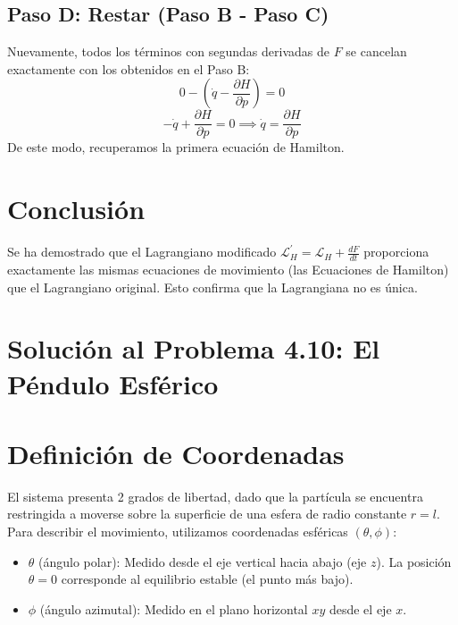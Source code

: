\documentclass[12pt, a4paper]{article}
\begin{document}
\subsection*{Paso D: Restar (Paso B - Paso C)}
Nuevamente, todos los términos con segundas derivadas de $F$ se cancelan exactamente con los obtenidos en el Paso B:
\begin{equation}
    0 - \left( \dot{q} - \frac{\partial H}{\partial p} \right) = 0
\end{equation}
\begin{equation}
    -\dot{q} + \frac{\partial H}{\partial p} = 0 \implies \dot{q} = \frac{\partial H}{\partial p}
\end{equation}
De este modo, recuperamos la primera ecuación de Hamilton.

\section*{Conclusión}

Se ha demostrado que el Lagrangiano modificado $\mathcal{L}_{H}^{\prime} = \mathcal{L}_{H} + \frac{dF}{dt}$ proporciona exactamente las mismas ecuaciones de movimiento (las Ecuaciones de Hamilton) que el Lagrangiano original.
Esto confirma que la Lagrangiana no es única.

\section{Solución al Problema 4.10: El Péndulo Esférico}

\section*{Definición de Coordenadas}

El sistema presenta 2 grados de libertad, dado que la partícula se encuentra restringida a moverse sobre la superficie de una esfera de radio constante $r=l$.
Para describir el movimiento, utilizamos coordenadas esféricas $(\theta, \phi)$:

\begin{itemize}
    \item $\theta$ (ángulo polar): Medido desde el eje vertical hacia abajo (eje $z$). La posición $\theta = 0$ corresponde al equilibrio estable (el punto más bajo).
    \item $\phi$ (ángulo azimutal): Medido en el plano horizontal $xy$ desde el eje $x$.
\end{itemize}
\end{document}
